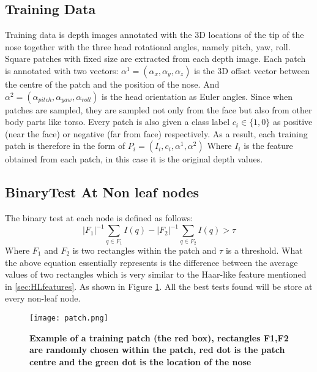 \subsection{Training Data}
\label{subsec:HPdataset}
Training data is depth images annotated with the 3D locations of the tip of the nose together with the three head rotational angles, namely pitch, yaw, roll. Square patches with fixed size are extracted from each depth image. Each patch is annotated with two vectors: $\alpha ^{1} = (\alpha _{x}, \alpha _{y}, \alpha _{z} )$ is the 3D offset vector between the centre of the patch and the position of the nose. And $\alpha ^{2} = (\alpha _{pitch}, \alpha _{yaw}, \alpha _{roll} )$ is the head orientation as Euler angles. Since when patches are sampled, they are sampled not only from the face but also from other body parts like torso. Every patch is also given a class label $c_{i} \in \{1,0\} $ as positive (near the face) or negative (far from face) respectively. As a result, each training patch is therefore in the form of $P_{i} = (I_{i},c_{i}, \alpha ^{1}, \alpha ^{2}) $ Where $I_{i}$ is the feature obtained from each patch, in this case it is the original depth values. \cite{GFRF}

\subsection{BinaryTest At Non leaf nodes}
\label{subsec:binarytest}
The binary test at each node is defined as follows:
\begin{equation}
\label{eq:binarytest}
|F_{1}|^{-1} \sum\limits_{q \in F_{1}} I(q) - |F_{2}|^{-1} \sum\limits_{q \in F_{2}} I(q) > \tau
\end{equation}
Where $F_{1} $ and $F_{2}$ is two rectangles  within the patch and $\tau$ is a threshold. What the above equation essentially represents is the difference between the average values of two rectangles which is very similar to the Haar-like feature mentioned in \ref{sec:HLfeatures}. \cite{GFRF} As shown in Figure \ref{fig:patch}. All the best tests found will be store at every non-leaf node.

\begin{figure}
	\centering
	\texttt{[image: patch.png]}
	\caption[sample patch]{\label{fig:patch}}  \textbf{Example of a training patch (the red box), rectangles F1,F2 are randomly chosen within the patch, red dot is the patch centre and the green dot is the location of the nose } \cite{GFRF}
\end{figure}

